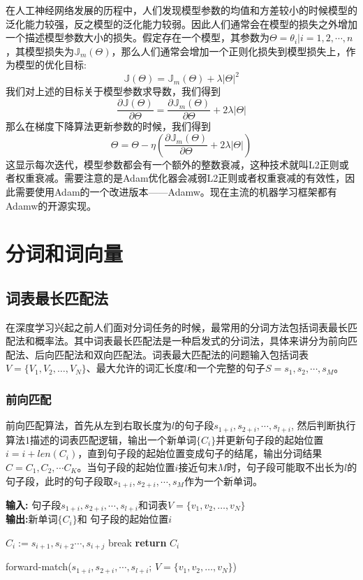 \documentclass[twoside,a4paper,12pt]{book}%
\begin{document}
在人工神经网络发展的历程中，人们发现模型参数的均值和方差较小的时候模型的泛化能力较强，反之模型的泛化能力较弱。因此人们通常会在模型的损失之外增加一个描述模型参数大小的损失。假定存在一个模型，其参数为$\Theta={\theta_i | i=1,2,\cdots,n}$，其模型损失为$\mathbb{J}_m(\Theta)$，那么人们通常会增加一个正则化损失到模型损失上，作为模型的优化目标:
$$
\mathbb{J}(\Theta)=\mathbb{J}_m(\Theta) + \lambda |\Theta|^2
$$
我们对上述的目标关于模型参数求导数，我们得到
$$
\frac{\partial{\mathbb{J}(\Theta)}}{\partial{\Theta}} = \frac{\partial{\mathbb{J}_m(\Theta)}}{\partial{\Theta}} + 2\lambda |\Theta|
$$
那么在梯度下降算法更新参数的时候，我们得到
$$
\Theta = \Theta - \eta( \frac{\partial{\mathbb{J}_m(\Theta)}}{\partial{\Theta}} + 2\lambda |\Theta|)
$$
这显示每次迭代，模型参数都会有一个额外的整数衰减，这种技术就叫L2正则或者权重衰减。需要注意的是Adam优化器会减弱L2正则或者权重衰减的有效性，因此需要使用Adam的一个改进版本——Adamw。现在主流的机器学习框架都有Adamw的开源实现。

\chapter{分词和词向量}

\section{词表最长匹配法}
在深度学习兴起之前人们面对分词任务的时候，最常用的分词方法包括词表最长匹配法和概率法。其中词表最长匹配法是一种启发式的分词法，具体来讲分为前向匹配法、后向匹配法和双向匹配法。词表最大匹配法的问题输入包括词表$V=\{V_1,V_2,\dots,V_N\}$、最大允许的词汇长度$l$和一个完整的句子$S=s_1,s_2,\cdots,s_M$。
\subsection{前向匹配}
前向匹配算法，首先从左到右取长度为$l$的句子段$s_{1+i},s_{2+i},\cdots,s_{l+i}$, 然后判断执行算法1描述的词表匹配逻辑，输出一个新单词$\{C_i\}$并更新句子段的起始位置$i=i + len(C_i)$，直到句子段的起始位置变成句子的结尾，输出分词结果$C=C_1,C_2, \cdots C_K$。当句子段的起始位置$i$接近句末$M$时，句子段可能取不出长为$l$的句子段，此时的句子段取$s_{1+i},s_{2+i},\cdots,s_{M}$作为一个新单词。
\begin{algorithm}[h]
    \textbf{输入:} 句子段$s_{1+i},s_{2+i},\cdots,s_{l+i}$和词表$V=\{v_1,v_2,\dots,v_N\}$\\
    \textbf{输出:}新单词$\{C_i\}$和 句子段的起始位置$i$
    \begin{algorithmic}[1]
     \label{algline:end} 
         \STATE $C_i:=s_{i+1},s_{i+2}\cdots,s_{i+j}$
         \STATE break \label{algline:break}
        \ENDIF  
    \ENDFOR \label{algline:endfor}
    \STATE \textbf{return} $C_i$ \label{algline:return}
    \end{algorithmic}
    \caption{forward-match($s_{1+i},s_{2+i},\cdots,s_{l+i}$; $V=\{v_1,v_2,\dots,v_N\}$)}
    \label{alg:alg1}
\end{algorithm}
\end{document}
